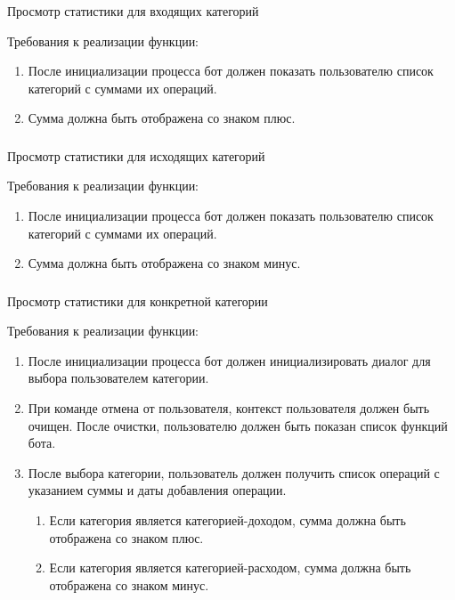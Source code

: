 \subsubsection{} Просмотр статистики для входящих категорий
\label{sec:domain:specification:showincomestats}

Требования к реализации функции:

\begin{enumerate}
	\item После инициализации процесса бот должен показать пользователю список категорий с суммами их операций.
	\item Сумма должна быть отображена со знаком плюс.
\end{enumerate}

\subsubsection{} Просмотр статистики для исходящих категорий
\label{sec:domain:specification:showexpensestats}

Требования к реализации функции:

\begin{enumerate}
	\item После инициализации процесса бот должен показать пользователю список категорий с суммами их операций.
	\item Сумма должна быть отображена со знаком минус.
\end{enumerate}

\subsubsection{} Просмотр статистики для конкретной категории
\label{sec:domain:specification:showcustomcategorystats}

Требования к реализации функции:

\begin{enumerate}
	\item После инициализации процесса бот должен инициализировать диалог для выбора пользователем категории.
	\item При команде отмена от пользователя, контекст пользователя должен быть очищен. После очистки, пользователю должен быть показан список функций бота.
	\item После выбора категории, пользователь должен получить список операций с указанием суммы и даты добавления операции.
	\begin{enumerate}
		\item Если категория является категорией-доходом, сумма должна быть отображена со знаком плюс.
		\item Если категория является категорией-расходом, сумма должна быть отображена со знаком минус.
	\end{enumerate}
\end{enumerate}

